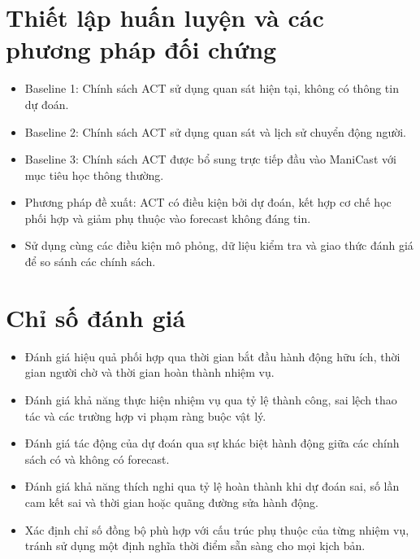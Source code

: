 \section{Thiết lập huấn luyện và các phương pháp đối chứng}

\begin{itemize}
    \item Baseline 1: Chính sách ACT sử dụng quan sát hiện tại, không có thông tin dự đoán.

    \item Baseline 2: Chính sách ACT sử dụng quan sát và lịch sử chuyển động người.

    \item Baseline 3: Chính sách ACT được bổ sung trực tiếp đầu vào ManiCast với mục tiêu học thông thường.

    \item Phương pháp đề xuất: ACT có điều kiện bởi dự đoán, kết hợp cơ chế học phối hợp và giảm phụ thuộc vào forecast không đáng tin.

    \item Sử dụng cùng các điều kiện mô phỏng, dữ liệu kiểm tra và giao thức đánh giá để so sánh các chính sách.
\end{itemize}


\section{Chỉ số đánh giá}

\begin{itemize}
    \item Đánh giá hiệu quả phối hợp qua thời gian bắt đầu hành động hữu ích, thời gian người chờ và thời gian hoàn thành nhiệm vụ.

    \item Đánh giá khả năng thực hiện nhiệm vụ qua tỷ lệ thành công, sai lệch thao tác và các trường hợp vi phạm ràng buộc vật lý.

    \item Đánh giá tác động của dự đoán qua sự khác biệt hành động giữa các chính sách có và không có forecast.

    \item Đánh giá khả năng thích nghi qua tỷ lệ hoàn thành khi dự đoán sai, số lần cam kết sai và thời gian hoặc quãng đường sửa hành động.

    \item Xác định chỉ số đồng bộ phù hợp với cấu trúc phụ thuộc của từng nhiệm vụ, tránh sử dụng một định nghĩa thời điểm sẵn sàng cho mọi kịch bản.
\end{itemize}


